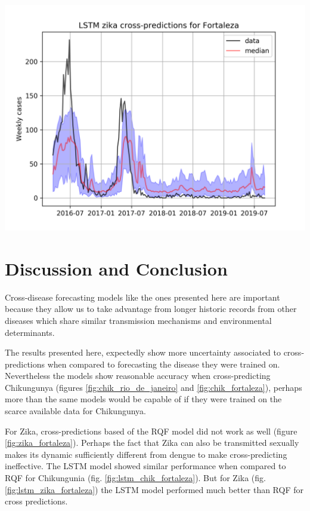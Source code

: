 \documentclass[a0,portrait]{a0poster}
\begin{document}
\begin{multicols}{3}
\begin{center}
\includegraphics[width=0.8\linewidth]{figures/lstm_zika_cross_Fortaleza.png} 
\label{fig:lstm_zika_fortaleza}
\end{center}%


\section*{Discussion and Conclusion}
Cross-disease forecasting models like the ones presented here are important 
because they allow us to take advantage from longer historic records from other 
diseases which share similar transmission mechanisms and environmental 
determinants.

The results presented here, expectedly show more uncertainty associated to 
cross-predictions when compared to forecasting the disease they were trained 
on. Nevertheless the models show reasonable accuracy when cross-predicting 
Chikungunya (figures \ref{fig:chik_rio_de_janeiro} and 
\ref{fig:chik_fortaleza}), perhaps more than the same models would be capable 
of if they were trained on the scarce available data for Chikungunya. 

For Zika, cross-predictions based of the RQF model did not work as well (figure 
\ref{fig:zika_fortaleza}). Perhaps the fact that Zika can also be transmitted 
sexually\cite{coelho2016higher} makes its dynamic sufficiently different from 
dengue to make cross-predicting ineffective. The LSTM model showed similar 
performance when compared to RQF for Chikungunia (fig. 
\ref{fig:lstm_chik_fortaleza}). But for Zika (fig. 
\ref{fig:lstm_zika_fortaleza}) the LSTM model performed much better than RQF 
for cross predictions.


\end{multicols}
\end{document}
